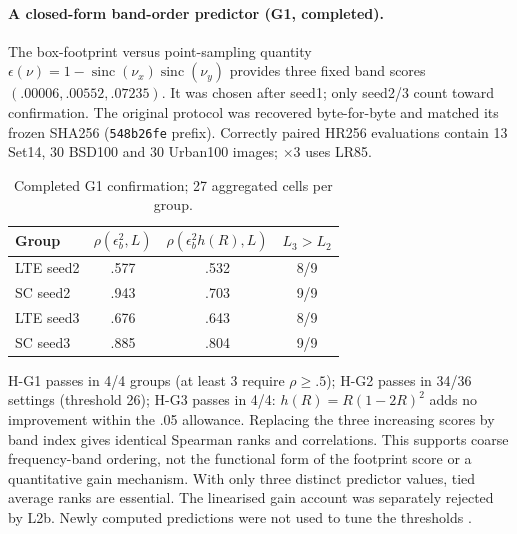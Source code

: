\paragraph{A closed-form band-order predictor (G1, completed).}
The box-footprint versus point-sampling quantity
$\epsilon(\nu)=1-\operatorname{sinc}(\nu_x)\operatorname{sinc}(\nu_y)$
provides three fixed band scores $(.00006,.00552,.07235)$. It was chosen
after seed1; only seed2/3 count toward confirmation. The original protocol
was recovered byte-for-byte and matched its frozen SHA256
(\texttt{548b26fe} prefix). Correctly paired HR256 evaluations contain
13 Set14, 30 BSD100 and 30 Urban100 images; $\times3$ uses LR85.
\begin{table}[t]\centering\small
\caption{Completed G1 confirmation; 27 aggregated cells per group.}
\label{tab:g1}
\begin{tabular}{lccc}\toprule
Group & $\rho(\epsilon_b^2,L)$ & $\rho(\epsilon_b^2h(R),L)$ & $L_3>L_2$\\\midrule
LTE seed2 & .577 & .532 & 8/9\\
SC seed2 & .943 & .703 & 9/9\\
LTE seed3 & .676 & .643 & 8/9\\
SC seed3 & .885 & .804 & 9/9\\\bottomrule
\end{tabular}
\end{table}
H-G1 passes in 4/4 groups (at least 3 require $\rho\ge.5$); H-G2
passes in 34/36 settings (threshold 26); H-G3 passes in 4/4:
$h(R)=R(1-2R)^2$ adds no improvement within the .05 allowance.
Replacing the three increasing scores by band index gives identical
Spearman ranks and correlations. This supports coarse frequency-band
ordering, not the functional form of the footprint score or a quantitative
gain mechanism. With only three distinct predictor values, tied average ranks
are essential. The linearised gain account was separately rejected by
L2b. Newly computed predictions were not used to tune the thresholds
.

